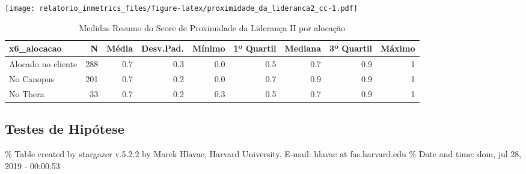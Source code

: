 \documentclass[]{book}
\begin{document}
\texttt{[image: relatorio\_inmetrics\_files/figure-latex/proximidade\_da\_lideranca2\_cc-1.pdf]}

\begin{table}[t]

\caption{\label{tab:unnamed-chunk-26}Medidas Resumo do Score de Proximidade da Liderança II por alocação}
\centering
\fontsize{7}{9}\selectfont
\begin{tabular}{lrrrrrrrr}
\toprule
x6\_alocacao & N & Média & Desv.Pad. & Mínimo & 1º Quartil & Mediana & 3º Quartil & Máximo\\
\midrule
Alocado no cliente & 288 & 0.7 & 0.3 & 0.0 & 0.5 & 0.7 & 0.9 & 1\\
No Canopus & 201 & 0.7 & 0.2 & 0.0 & 0.7 & 0.9 & 0.9 & 1\\
No Thera & 33 & 0.7 & 0.2 & 0.3 & 0.5 & 0.7 & 0.9 & 1\\
\bottomrule
\end{tabular}
\end{table}

\pagebreak

\hypertarget{testes-de-hipotese-8}{%
\subsection{Testes de Hipótese}\label{testes-de-hipotese-8}}

\% Table created by stargazer v.5.2.2 by Marek Hlavac, Harvard University. E-mail: hlavac at fas.harvard.edu
\% Date and time: dom, jul 28, 2019 - 00:00:53
\end{document}
